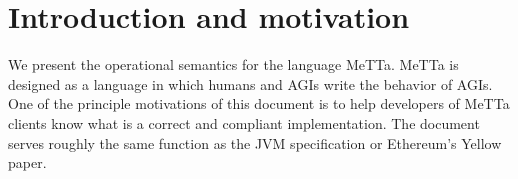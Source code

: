 \section{Introduction and motivation}
We present the operational semantics for the language MeTTa. MeTTa is designed as a language in which humans and AGIs write the behavior of AGIs. One of the principle motivations of this document is to help developers of MeTTa clients know what is a correct and compliant implementation. The document serves roughly the same function as the JVM specification or Ethereum's Yellow paper.
